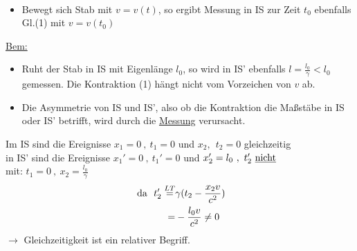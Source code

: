 \documentclass[titlepage,12pt,a4paper,ngerman]{report}
\newcommand{\tx}[1]{\textrm{#1}}
\begin{document}
{\begin{align*}
\end{align*}
\begin{itemize}
	\item Bewegt sich Stab mit $ v = v(t) $, so ergibt Messung in IS zur Zeit $ t_0 $ ebenfalls Gl.(1) mit $ v=v(t_0) $
\end{itemize}
\underline{Bem:}
\begin{itemize}
	\item Ruht der Stab in IS mit Eigenlänge $ l_0 $, so wird in IS' ebenfalls $ l=\frac{l_0}{\gamma} < l_0 $ gemessen. Die Kontraktion (1) hängt nicht vom Vorzeichen von $ v $ ab.
	\item Die Asymmetrie von IS und IS', also ob die Kontraktion die Maßstäbe in IS oder IS' betrifft, wird durch die \underline{Messung} verursacht.
\end{itemize}
Im IS sind die Ereignisse $ x_1 = 0\ , \ t_1 = 0 $ und $ x_2,\ \ t_2 = 0 $ gleichzeitig\\
in IS' sind die Ereignisse $ x_1' = 0 \ , \ t_1' = 0 $ und $ x_2' = l_0 \ , \ t_2' \tx{ \underline{nicht} } $\\
mit: $ t_1 = 0  \ , \ x_2 = \frac{l_0}{\gamma} $
\begin{align*}
\tx{ da } \ t_2' \buildrel LT \over = &\gamma (t_2 - \frac{x_2 v}{c^2})\\
= &- \frac{l_0 v}{c^2} \neq 0
\end{align*} 
$ \rightarrow $ Gleichzeitigkeit ist ein relativer Begriff.

}
\end{document}
